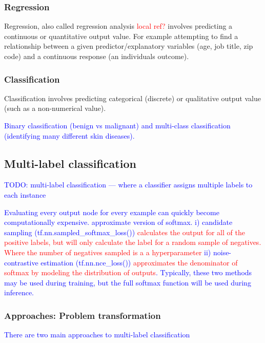 \subsubsection{Regression} 

Regression, also called regression analysis \textcolor{red}{local ref?} involves predicting a continuous or quantitative output value. For example attempting to find a relationship between a given predictor/explanatory variables (age, job title, zip code) and a continuous response (an individuals outcome).

\subsubsection{Classification} 

Classification involves predicting categorical (discrete) or qualitative output value (such as a non-numerical value). 

\textcolor{blue}{Binary classification (benign vs malignant) and multi-class classification (identifying many different skin diseases).}

\subsection{Multi-label classification}
\textcolor{blue}{TODO: {multi-label classification} --- where a classifier assigns multiple labels to each instance}

\textcolor{blue}{Evaluating every output node for every example can quickly become computationally expensive. approximate version of softmax. i) candidate sampling (tf.nn.sampled\_softmax\_loss()) \textcolor{red}{calculates the output for all of the positive labels, but will only calculate the label for a random sample of negatives. Where the number of negatives sampled is a a hyperparameter} ii) noise-contrastive estimation (tf.nn.nce\_loss()) \textcolor{red}{approximates the denominator of softmax by modeling the distribution of outputs}. Typically, these two methods may be used during training, but the full softmax function will be used during inference.}


\subsubsection{Approaches: Problem transformation}

\textcolor{blue}{There are two main approaches to multi-label classification}

